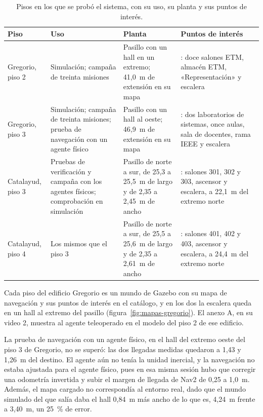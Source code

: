 \begin{table}[H]
  \centering\footnotesize{}
  \caption{Pisos en los que se probó el sistema, con su uso, su planta y sus puntos de interés.}
  \label{tab:entornos}
  \begin{tabular}{@{}>{\raggedright\arraybackslash}p{}>{\raggedright\arraybackslash}p{}>{\raggedright\arraybackslash}p{}>{\raggedright\arraybackslash}p{}@{}}
    \toprule
    \textbf{Piso} & \textbf{Uso} & \textbf{Planta} & \textbf{Puntos de interés} \\ \midrule
    Gregorio, piso 2 & Simulación; campaña de treinta misiones & Pasillo con un hall en un extremo; 41,0~m de extensión en su mapa & 15: doce salones ETM, almacén ETM, «Representación» y escalera \\ \addlinespace
    Gregorio, piso 3 & Simulación; campaña de treinta misiones; prueba de navegación con un agente físico & Pasillo con un hall al oeste; 46,9~m de extensión en su mapa & 16: dos laboratorios de sistemas, once aulas, sala de docentes, rama IEEE y escalera \\ \addlinespace
    Catalayud, piso 3 & Pruebas de verificación y campaña con los agentes físicos; comprobación en simulación & Pasillo de norte a sur, de 25,3 a 25,5~m de largo y de 2,35 a 2,45~m de ancho & 5: salones 301, 302 y 303, ascensor y escalera, a 22,1~m del extremo norte \\ \addlinespace
    Catalayud, piso 4 & Los mismos que el piso 3 & Pasillo de norte a sur, de 25,5 a 25,6~m de largo y de 2,35 a 2,61~m de ancho & 5: salones 401, 402 y 403, ascensor y escalera, a 24,4~m del extremo norte \\ \bottomrule
  \end{tabular}
\end{table}

Cada piso del edificio Gregorio es un mundo de Gazebo con su mapa de navegación y sus puntos de interés en el catálogo, y en los dos la escalera queda en un hall al extremo del pasillo (figura~\ref{fig:mapas-gregorio}). El anexo A, en su video 2, muestra al agente teleoperado en el modelo del piso 2 de ese edificio.

La prueba de navegación con un agente físico, en el hall del extremo oeste del piso 3 de Gregorio, no se superó: las dos llegadas medidas quedaron a 1,43 y 1,26~m del destino. El agente aún no tenía la unidad inercial, y la navegación no estaba ajustada para el agente físico, pues en esa misma sesión hubo que corregir una odometría invertida y subir el margen de llegada de Nav2 de 0,25 a 1,0~m. Además, el mapa cargado no correspondía al entorno real, dado que el mundo simulado del que salía daba el hall 0,84~m más ancho de lo que es, 4,24~m frente a 3,40~m, un 25~\% de error.

